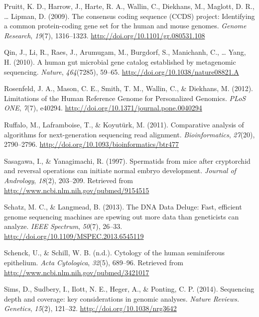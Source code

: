 \documentclass[12pt,twoside]{reedthesis}
\theoremstyle{definition}
\theoremstyle{definition}
\theoremstyle{remark}
\begin{document}
  \hypertarget{ref-Pruitt2009}{}
  Pruitt, K. D., Harrow, J., Harte, R. A., Wallin, C., Diekhans, M.,
  Maglott, D. R., \ldots{} Lipman, D. (2009). The consensus coding
  sequence (CCDS) project: Identifying a common protein-coding gene set
  for the human and mouse genomes. \emph{Genome Research}, \emph{19}(7),
  1316--1323. \url{http://doi.org/10.1101/gr.080531.108}
  
  \hypertarget{ref-Qin2010}{}
  Qin, J., Li, R., Raes, J., Arumugam, M., Burgdorf, S., Manichanh, C.,
  \ldots{} Yang, H. (2010). A human gut microbial gene catalog established
  by metagenomic sequencing. \emph{Nature}, \emph{464}(7285), 59--65.
  \url{http://doi.org/10.1038/nature08821.A}
  
  \hypertarget{ref-Rosenfeld2012}{}
  Rosenfeld, J. A., Mason, C. E., Smith, T. M., Wallin, C., \& Diekhans,
  M. (2012). Limitations of the Human Reference Genome for Personalized
  Genomics. \emph{PLoS ONE}, \emph{7}(7), e40294.
  \url{http://doi.org/10.1371/journal.pone.0040294}
  
  \hypertarget{ref-Ruffalo2011}{}
  Ruffalo, M., Laframboise, T., \& Koyutürk, M. (2011). Comparative
  analysis of algorithms for next-generation sequencing read alignment.
  \emph{Bioinformatics}, \emph{27}(20), 2790--2796.
  \url{http://doi.org/10.1093/bioinformatics/btr477}
  
  \hypertarget{ref-Sasagawa}{}
  Sasagawa, I., \& Yanagimachi, R. (1997). Spermatids from mice after
  cryptorchid and reversal operations can initiate normal embryo
  development. \emph{Journal of Andrology}, \emph{18}(2), 203--209.
  Retrieved from \url{http://www.ncbi.nlm.nih.gov/pubmed/9154515}
  
  \hypertarget{ref-Schatz2013}{}
  Schatz, M. C., \& Langmead, B. (2013). The DNA Data Deluge: Fast,
  efficient genome sequencing machines are spewing out more data than
  geneticists can analyze. \emph{IEEE Spectrum}, \emph{50}(7), 26--33.
  \url{http://doi.org/10.1109/MSPEC.2013.6545119}
  
  \hypertarget{ref-Schenck}{}
  Schenck, U., \& Schill, W. B. (n.d.). Cytology of the human seminiferous
  epithelium. \emph{Acta Cytologica}, \emph{32}(5), 689--96. Retrieved
  from \url{http://www.ncbi.nlm.nih.gov/pubmed/3421017}
  
  \hypertarget{ref-Sims2014}{}
  Sims, D., Sudbery, I., Ilott, N. E., Heger, A., \& Ponting, C. P.
  (2014). Sequencing depth and coverage: key considerations in genomic
  analyses. \emph{Nature Reviews. Genetics}, \emph{15}(2), 121--32.
  \url{http://doi.org/10.1038/nrg3642}
  
\end{document}

